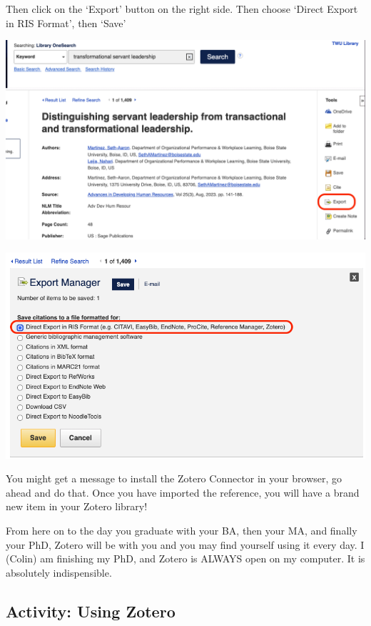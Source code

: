 \documentclass[
]{book}
\theoremstyle{definition}
\theoremstyle{definition}
\theoremstyle{definition}
\theoremstyle{definition}
\theoremstyle{remark}
\begin{document}
Then click on the `Export' button on the right side. Then choose `Direct Export in RIS Format', then `Save'

\includegraphics{assets/u2/library2.png}

\includegraphics{assets/u2/library3.png}

You might get a message to install the Zotero Connector in your browser, go ahead and do that. Once you have imported the reference, you will have a brand new item in your Zotero library!

From here on to the day you graduate with your BA, then your MA, and finally your PhD, Zotero will be with you and you may find yourself using it every day. I (Colin) am finishing my PhD, and Zotero is ALWAYS open on my computer. It is absolutely indispensible.

\hypertarget{activity-using-zotero}{%
\subsection*{Activity: Using Zotero}\label{activity-using-zotero}}
\end{document}
